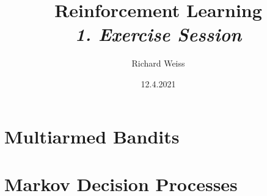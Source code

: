 \documentclass{article}
\title
{
  Reinforcement Learning \\
  \vspace{4pt}
  \normalsize
  \textit{1. Exercise Session}
}
\author{Richard Weiss}
\date{12.4.2021}
\numberwithin{figure}{section}
\begin{document}
\maketitle

\setcounter{section}{0}
\section{Multiarmed Bandits}








\setcounter{section}{1}
\section{Markov Decision Processes}

















\printbibliography
\end{document}
